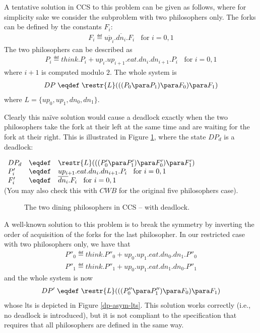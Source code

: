 A tentative solution in CCS to this problem can be given as follows, where for simplicity sake we consider
the subproblem with two philosophers only.
The forks can be defined by the constants $F_i$: 
\begin{eqnarray*}
F_i \eqdef  \overline{up_i}.\overline{dn_i}.F_i \; \;  \mbox{   for  }i = 0, 1  
\end{eqnarray*}
The two philosophers can be described as 
\begin{eqnarray*}
P_i \eqdef think.P_i +  up_i.up_{i+1}.eat.dn_i.dn_{i+1}.P_i  \; \;  \mbox{   for  }i = 0, 1 
\end{eqnarray*}
where $i+1$ is computed modulo $2$. 
The whole system is 
\begin{eqnarray*}
DP \;  \eqdef \;  \restr{L}(((P_0\para P_1) \para F_0) \para F_1) 
\end{eqnarray*}
where $L = \{up_0, up_1, dn_0, dn_1\}$. 

Clearly this na\"ive solution would cause a deadlock exactly when the two philosophers take the fork at their left at the same time 
and are waiting for the fork at their right. This is illustrated in Figure \ref{dp-dead-lts}, where the state $DP_d$ is a deadlock:

 $\begin{array}{llllllll}
DP_d  & \eqdef  & \restr{L}(((P'_0\para P'_1) \para F'_0) \para F'_1) \\
P'_i & \eqdef &  up_{i+1}.eat.dn_i.dn_{i+1}.P_i  \; \;  \mbox{   for  }i = 0, 1\\
F'_i & \eqdef & \overline{dn_i}.F_i \; \;  \mbox{   for  }i = 0, 1 
 \end{array}$\\
(You may also check this with $CWB$ for the original five philosophers case). 

\begin{figure}[t]
\centering

\caption{The two dining philosophers in CCS -- with deadlock.}
\label{dp-dead-lts}
\end{figure}


A well-known solution to this problem is to break the symmetry by inverting the order of
acquisition of the forks for the last philosopher. In our restricted case with two philosophers only, we have that
\begin{eqnarray*}
P''_0 \eqdef think.P''_0 +  up_0.up_1.eat.dn_0.dn_1.P''_0  \\
P''_1 \eqdef think.P''_1 +  up_0.up_1.eat.dn_1.dn_0.P''_1 
\end{eqnarray*}
and the whole system is now
\begin{eqnarray*}
DP' \;  \eqdef \;  \restr{L}(((P''_0\para P''_1) \para F_0) \para F_1) 
\end{eqnarray*}
whose lts is depicted in Figure \ref{dp-asym-lts}.
This solution works correctly (i.e., no deadlock is introduced), but it is not compliant to the specification that requires that all philosophers
are defined in the same way.

